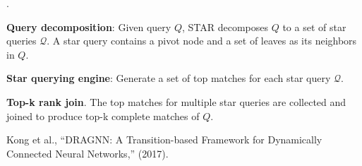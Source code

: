 \documentclass[11pt]{article}
\newcommand\myspace[1][]{\vspace{#1\bigskipamount}}
\newcommand\p{\Needspace{10\baselineskip} \noindent}
\begin{document}
\myspace
\p {}. 
\begin{compactenum}
	\item \textbf{Query decomposition}: Given query $Q$, STAR decomposes $Q$ to a set of star queries $\mathcal Q$. A star query contains a pivot node and a set of leaves as its neighbors in $Q$. 
	
	\item \textbf{Star querying engine}: Generate a set of top matches for each star query $\mathcal Q$. 
	
	\item \textbf{Top-k rank join}. The top matches for multiple star queries are collected and joined to produce top-k complete matches of $Q$. 
\end{compactenum}


\begin{comment}


\lecture{Papers and Tutorials}{Generalized Neural Graph Embedding with Matrix Factorization}{Nov 17, 2017}
\vspace{-1em}
{\footnotesize J. Guo, L. Xu, X. Huang, E. Chen, ``Generalized Neural Graph Embedding with Matrix Factorization,'' (2017).}

\end{comment}









\begin{comment}
\lecture{Papers and Tutorials}{Fast Linear Model for Knowledge Graph Embeddings}{Nov 17, 2017}
\vspace{-1em}
{\footnotesize A. Joulin, E. Grave, P. Bojanowski, M. Nickel, and T. Mikolov, ``Fast Linear Model for Knowledge Graph Embeddings,'' (2017).}
\end{comment}



\vspace{-1em}
{\footnotesize Kong et al., ``DRAGNN: A Transition-based Framework for Dynamically Connected Neural Networks,'' (2017).}
\end{document}
